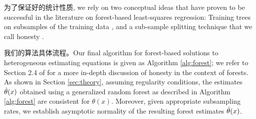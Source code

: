 \documentclass[aos]{imsart}
\theoremstyle{plain}
\theoremstyle{definition}
\theoremstyle{remark}
\begin{document}
\begin{CJK}{UTF8}{gbsn}
为了保证好的统计性质,
we rely on two conceptual ideas that have proven to be successful in the literature
on forest-based least-squares regression: Training trees on subsamples of the training data
\citep{mentch2016quantifying,scornet2015consistency,wager2015estimation}, and a sub-sample
splitting technique that we call honesty \citep{biau2012analysis,denil2014narrowing,wager2015estimation}.


我们的算法具体流程。Our final algorithm for forest-based solutions to heterogeneous estimating equations is given as Algorithm \ref{alg:forest}; we refer to Section 2.4 of \citet{wager2015estimation} for a more in-depth discussion
of honesty in the context of forests.
As shown in Section \ref{sec:theory}, 
assuming regularity conditions, the estimates $\hat{\theta}(x)$ obtained using
a generalized random forest as described in Algorithm \ref{alg:forest} are consistent for $\theta(x)$.
Moreover, given appropriate subsampling rates, we establish asymptotic normality of the resulting forest estimates $\hat{\theta}(x)$.

\newpage



\newcommand{\pluseq}{\mathrel{+}=}


\end{CJK}
\end{document}
